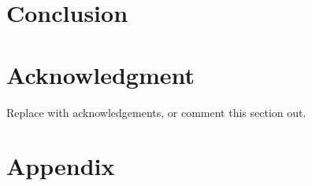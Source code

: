 \documentclass[draft, twocolumn]{manuscript}
\begin{document}
\section{Conclusion}


\section*{Acknowledgment}
Replace with acknowledgements, or comment this section out.




\onecolumn
\appendix
\section{Appendix}\label{sec:appendix}

\end{document}
